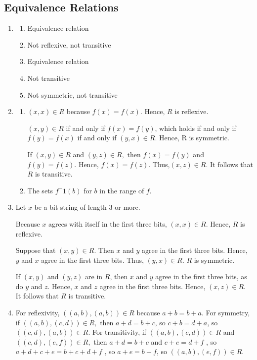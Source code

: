 \documentclass{sig-alternate-05-2015}
\begin{document}
\subsection{Equivalence Relations}
\begin{enumerate}
\item
	\begin{enumerate}
		\item Equivalence relation \item Not reflexive, not transitive
		\item Equivalence relation \item Not transitive \item Not symmetric,
		not transitive
	\end{enumerate}
\item
	\begin{enumerate}
		\item  $(x, x) \in R $ because $f (x) = f (x)$. Hence, $R$ is reflexive.
		
		$(x, y) \in R$ if and only if $f (x) = f (y)$, which holds if and
		only if $f (y) = f (x)$ if and only if $(y, x) \in R.$ Hence, R is
		symmetric. 
		
		If $(x, y) \in R$ and $(y, z) \in R,$ then $f (x) = f (y)$
		and $f (y) = f (z)$. Hence, $f (x) = f (z)$. Thus,$ (x, z) \in R$.
		It follows that $R$ is transitive. 
		\item   The sets $f^−1(b)$ for $b$ in the range of $f$.
	\end{enumerate}

\item 
Let $x$ be a bit string of length 3 or more.

Because $x$ agrees with itself in the first three bits, $(x, x)\in R.$
Hence, $R$ is reflexive. 

Suppose that $(x, y) \in R.$ Then $x$ and $y$ agree in the first three bits. 
Hence, $y$ and $x$ agree in the first three bits. Thus, $(y, x)\in R$. $R$ is symmetric.

If $(x, y)$ and $(y, z)$ are in $R$, then
$x$ and $y$ agree in the first three bits, as do $y$ and $z$. Hence, $x$
and $z$ agree in the first three bits. Hence, $(x, z) \in R.$ It follows
that $R$ is transitive.

\item
For reflexivity,
$((a, b), (a, b))\in R$ because $a +b = b +a$. For symmetry, if
$((a, b), (c, d))\in R,$ then $a + d = b + c$, so $c + b = d + a$,
so $((c, d), (a, b))\in R.$ For transitivity, if $((a, b), (c, d)) \in R$
 and $((c, d), (e, f )) \in R,$ then $a+d = b+c$ and $c+e = d+f$ ,
so $a + d + c + e = b + c + d + f$ , so $a + e = b + f $,
so $((a, b), (e, f ))\in R.$ 


\end{enumerate}
\end{document}
